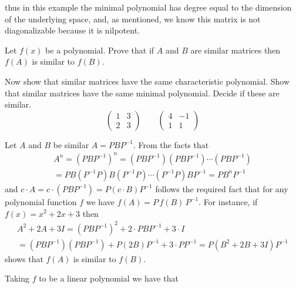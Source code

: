 \begin{exercises}
\begin{answer}
      thus in this example the minimal polynomial has degree equal to the 
      dimension of the underlying space, and, as mentioned,
      we know this matrix is not diagonalizable because it is nilpotent. 
    \end{answer}
   \item 
     Let $f(x)$ be a polynomial.
     Prove that if $A$ and $B$ are similar matrices then $f(A)$ is 
     similar to $f(B)$.
     \begin{exparts}
       \partsitem Now show that similar matrices have the same characteristic
         polynomial.
       \partsitem Show that similar matrices have the same minimal polynomial.
       \partsitem Decide if these are similar.
          \begin{equation*}
            \begin{pmatrix}
              1  &3  \\
              2  &3
            \end{pmatrix}
            \qquad
            \begin{pmatrix}
              4  &-1 \\
              1  &1
            \end{pmatrix}
          \end{equation*}
     \end{exparts}
     \begin{answer}
       Let \( A \) and \( B \) be similar \( A=PBP^{-1} \).
       From the facts that 
       \begin{multline*}
           A^n=(PBP^{-1})^n=(PBP^{-1})(PBP^{-1})\cdots(PBP^{-1})   \\
                           =PB(P^{-1}P)B(P^{-1}P)\cdots (P^{-1}P)BP^{-1}
                           =PB^nP^{-1}
       \end{multline*}
       and $c\cdot A=c\cdot(PBP^{-1})=P(c\cdot B)P^{-1}$ follows 
       the required fact that for any polynomial function $f$ we have 
       \( f(A)=P\,f(B)\,P^{-1} \).
       For instance, if $f(x)=x^2+2x+3$ then
       \begin{multline*}
         A^2+2A+3I=(PBP^{-1})^2+2\cdot PBP^{-1}+3\cdot I           \\
                  =(PBP^{-1})(PBP^{-1})+P(2B)P^{-1}+3\cdot PP^{-1}
                  =P(B^2+2B+3I)P^{-1}
       \end{multline*}
       shows that $f(A)$ is similar to $f(B)$.
       \begin{exparts}
         \partsitem Taking $f$ to be a linear polynomial we have that

\end{exparts}
\end{answer}
\end{exercises}
